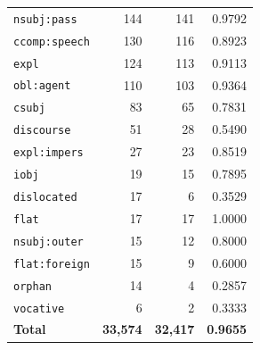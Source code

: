 \begin{table}[ht]
\begin{tabular}{lrrr}
\texttt{nsubj\!:\!pass} & 144 & 141 & 0.9792 \\
\texttt{ccomp\!:\!speech} & 130 & 116 & 0.8923 \\
\texttt{expl} & 124 & 113 & 0.9113 \\
\texttt{obl\!:\!agent} & 110 & 103 & 0.9364 \\
\texttt{csubj} & 83 & 65 & 0.7831 \\
\texttt{discourse} & 51 & 28 & 0.5490 \\
\texttt{expl\!:\!impers} & 27 & 23 & 0.8519 \\
\texttt{iobj} & 19 & 15 & 0.7895 \\
\texttt{dislocated} & 17 & 6 & 0.3529 \\
\texttt{flat} & 17 & 17 & 1.0000 \\
\texttt{nsubj\!:\!outer} & 15 & 12 & 0.8000 \\
\texttt{flat\!:\!foreign} & 15 & 9 & 0.6000 \\
\texttt{orphan} & 14 & 4 & 0.2857 \\
\texttt{vocative} & 6 & 2 & 0.3333 \\
\midrule
\textbf{Total} & \textbf{33,574} & \textbf{32,417} & \textbf{0.9655} \\
\bottomrule
\end{tabular}
\end{table}
